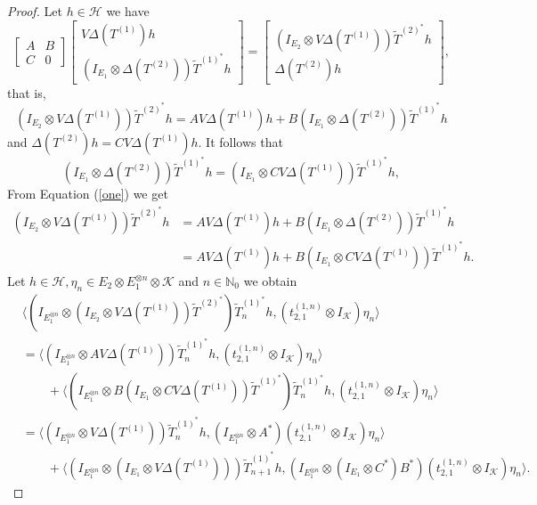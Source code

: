 \documentclass[12pt]{amsart}
\numberwithin{equation}{section}
\theoremstyle{plain}
\newcommand{\ot}{\otimes}
\newcommand{\wt}{\widetilde}
\newcommand{\wT}{\wt{T}}
\begin{document}
	\begin{proof}
		Let $h \in \mathcal H$ we have
		\[\begin{bmatrix}A&B\\C&0\end{bmatrix} \begin{bmatrix} V\Delta(T^{(1)})h\\ (I_{E_1} \ot \Delta(T^{(2)}))\wT^{(1)^*}h \end{bmatrix}= \begin{bmatrix} (I_{E_2} \ot V\Delta(T^{(1)}))\wT^{(2)^*}h \\  \Delta(T^{(2)})h\end{bmatrix},\]
		that is,
		\begin{equation} \label{one} (I_{E_2} \ot V\Delta(T^{(1)}))\wT^{(2)^*}h= AV\Delta(T^{(1)})h+
			B(I_{E_1} \ot \Delta(T^{(2)}))\wT^{(1)^*}h
		\end{equation}
		and $\Delta(T^{(2)})h= CV\Delta(T^{(1)})h.$	It follows that
		\begin{equation*}\label{two}
			(I_{E_1}\ot \Delta(T^{(2)}))\wT^{(1)^*}h= (I_{E_1}\ot CV\Delta(T^{(1)}))\wT^{(1)^*}h,
		\end{equation*}
	From Equation (\ref{one}) we get
	\[\begin{split}
		(I_{E_2} \ot V\Delta(T^{(1)}))\wT^{(2)^*}h&= AV\Delta(T^{(1)})h+
		B(I_{E_1} \ot \Delta(T^{(2)}))\wT^{(1)^*}h \\ & =  AV\Delta(T^{(1)})h+
		B(I_{E_1}\ot CV\Delta(T^{(1)}))\wT^{(1)^*}h.
	\end{split}\]  Let $h\in \mathcal{H},\eta_n\in E_2\ot E_1^{\ot n}\ot \mathcal{K}$ and $n\in \mathbb{N}_{0}$ we obtain
\begin{align*}
&\langle (I_{E_1^{\ot n}}\ot (I_{E_2} \ot V\Delta(T^{(1)}))\wT^{(2)^*})\wT_n^{(1)^*}h,(t_{2,1}^{(1,n)}\ot I_{\mathcal{K}})\eta_n \rangle\\&=\langle (I_{E_1^{\ot n}}\ot AV\Delta(T^{(1)}))\wT_n^{(1)^*}h,(t_{2,1}^{(1,n)}\ot I_{\mathcal{K}})\eta_n \rangle \\& \quad\quad +\langle (I_{E_1^{\ot n}}\ot B(I_{E_1}\ot CV\Delta(T^{(1)}))\wT^{(1)^*})\wT_n^{(1)^*}h,(t_{2,1}^{(1,n)}\ot I_{\mathcal{K}})\eta_n \rangle \\&=\langle (I_{E_1^{\ot n}}\ot V\Delta(T^{(1)}))\wT_n^{(1)^*}h,(I_{E_1^{\ot n}}\ot A^*)(t_{2,1}^{(1,n)}\ot I_{\mathcal{K}})\eta_n \rangle \\& \quad\quad +\langle (I_{E_1^{\ot n}}\ot (I_{E_1}\ot V\Delta(T^{(1)})))\wT_{n+1}^{(1)^*}h,(I_{E_1^{\ot n}}\ot (I_{E_1}\ot C^*)B^*)(t_{2,1}^{(1,n)}\ot I_{\mathcal{K}})\eta_n \rangle.

\end{align*}
\end{proof}
\end{document}
